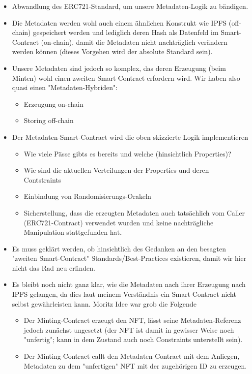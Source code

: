 \begin{itemize}
  \item Abwandlung des ERC721-Standard, um unsere Metadaten-Logik zu bändigen.
  \item Die Metadaten werden wohl auch einem ähnlichen Konstrukt wie IPFS (off-chain) gespeichert werden und lediglich deren Hash als Datenfeld im Smart-Contract (on-chain), damit die Metadaten nicht nachträglich verändern werden können (dieses Vorgehen wird der absolute Standard sein).
  \item Unsere Metadaten sind jedoch so komplex, das deren Erzeugung (beim Minten) wohl einen zweiten Smart-Contract erfordern wird. Wir haben also quasi einen "Metadaten-Hybriden":
  \begin{itemize}
  	\item Erzeugung on-chain
  	\item Storing off-chain
  \end{itemize}
  \item Der Metadaten-Smart-Contract wird die oben skizzierte Logik implementieren
  \begin{itemize}
  	\item Wie viele Pässe gibts es bereits und welche (hinsichtlich Properties)?
  	\item Wie sind die aktuellen Verteilungen der Properties und deren Contstraints
  	\item Einbindung von Randomisierungs-Orakeln
  	\item Sicherstellung, dass die erzeugten Metadaten auch tatsächlich vom Caller (ERC721-Contract) verwendet wurden und keine nachträgliche Manipulation stattgefunden hat.
  \end{itemize}
  \item Es muss geklärt werden, ob hinsichtlich des Gedanken an den besagten "zweiten Smart-Contract" Standards/Best-Practices existieren, damit wir hier nicht das Rad neu erfinden.
  \item Es bleibt noch nicht ganz klar, wie die Metadaten nach ihrer Erzeugung nach IPFS gelangen, da dies laut meinem Verständnis ein Smart-Contract nicht selbst gewährleisten kann. Moritz Idee war grob die Folgende 
  \begin{itemize}
    \item Der Minting-Contract erzeugt den NFT, lässt seine Metadaten-Referenz jedoch zunächst ungesetzt (der NFT ist damit in gewisser Weise noch "unfertig"; kann in dem Zustand auch noch Constraints unterstellt sein).
    \item Der Minting-Contract callt den Metadaten-Contract mit dem Anliegen, Metadaten zu dem "unfertigen" NFT mit der zugehörigen ID zu erzeugen.

\end{itemize}
\end{itemize}
